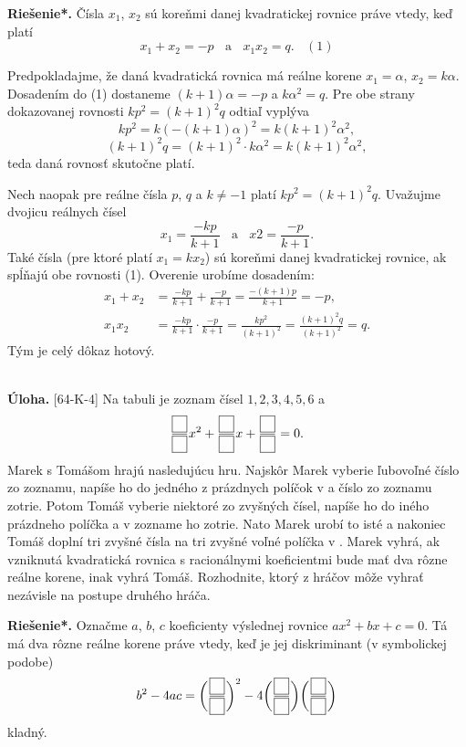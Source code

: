 \documentclass[11pt,a4paper,oneside,final]{book}
\newcommand{\ul}{\textbf{Úloha.} }
\newcommand{\rieh}{\textbf{Riešenie*.} }
\begin{document}
\rieh Čísla $x_1$, $x_2$ sú koreňmi danej kvadratickej rovnice práve vtedy, keď platí
$$x_1 + x_2 = -p \ \ \ \ \text{a} \ \ \ \  x_1 x_2 = q. \ \ \ \  (1)$$

Predpokladajme, že daná kvadratická rovnica má reálne korene $x_1 = \alpha$, $x_2 = k\alpha$.
Dosadením do (1) dostaneme $(k + 1)\alpha = -p$ a $k\alpha^2 = q$. Pre obe strany dokazovanej
rovnosti $kp^2 = (k + 1)^2 q$ odtiaľ vyplýva
$$kp^2= k(-(k + 1)\alpha)^2= k(k + 1)^2\alpha^2,$$
$$(k + 1)^2q = (k + 1)^2 \cdot k\alpha^2= k(k + 1)^2\alpha^2,$$
teda daná rovnosť skutočne platí.

Nech naopak pre reálne čísla $p$, $q$ a $k \neq -1$ platí $kp^2 = (k+1)^2q$. Uvažujme dvojicu
reálnych čísel
$$x_1 =\frac{-kp}{k + 1} \ \ \ \ \text{a} \ \ \ \  x 2 =\frac{-p}{k + 1}.$$
Také čísla (pre ktoré platí $x_1 = kx_2$) sú koreňmi danej kvadratickej rovnice, ak spĺňajú obe rovnosti (1). Overenie urobíme dosadením:
\begin{align*}
x_1 + x_2 &= \frac{-kp}{k + 1}+\frac{-p}{k + 1}=\frac{-(k + 1)p}{k + 1}= -p,\\
x_1 x_2 &=\frac{-kp}{k + 1}\cdot\frac{-p}{k + 1}=\frac{kp^2}{(k + 1)^2}=\frac{(k + 1)^2q}{(k + 1)^2}= q.
\end{align*}
Tým je celý dôkaz hotový.\\
\\
\begin{tcolorbox}[breakable,notitle,boxrule=0pt,colback=light-gray,colframe=light-gray]\ul [64-K-4]  Na tabuli je zoznam čísel $1, 2, 3, 4, 5, 6$ a 
$$\frac{\fbox{$\phantom{7}$}}{\fbox{$\phantom{7}$}}x^2+\frac{\fbox{$\phantom{7}$}}{\fbox{$\phantom{7}$}}x + \frac{\fbox{$\phantom{7}$}}{\fbox{$\phantom{7}$}}= 0.$$
Marek s Tomášom hrajú nasledujúcu hru. Najskôr Marek vyberie ľubovoľné číslo zo zoznamu, napíše ho do jedného z prázdnych políčok v  a číslo zo zoznamu zotrie. Potom Tomáš vyberie niektoré zo zvyšných čísel, napíše ho do iného prázdneho políčka a v zozname ho zotrie. Nato Marek urobí to isté a nakoniec Tomáš doplní tri zvyšné čísla na tri zvyšné voľné políčka v . Marek vyhrá, ak vzniknutá kvadratická rovnica s racionálnymi koeficientmi bude mať dva rôzne reálne korene, inak vyhrá Tomáš. Rozhodnite, ktorý z hráčov môže vyhrať nezávisle na postupe druhého
hráča.

\end{tcolorbox}

\rieh Označme $a$, $b$, $c$ koeficienty výslednej rovnice $ax^2 + bx + c = 0$. Tá má dva rôzne reálne korene práve vtedy, keď je jej diskriminant (v symbolickej podobe)
$$b^2 - 4ac =\bigg( \frac{{\fbox{$\phantom{7}$}}}{{\fbox{$\phantom{7}$}}} \bigg)^2-4\bigg( \frac{{\fbox{$\phantom{7}$}}}{{\fbox{$\phantom{7}$}}}\bigg) \bigg(\frac{{\fbox{$\phantom{7}$}}}{{\fbox{$\phantom{7}$}}}\bigg)$$
kladný.
\end{document}

